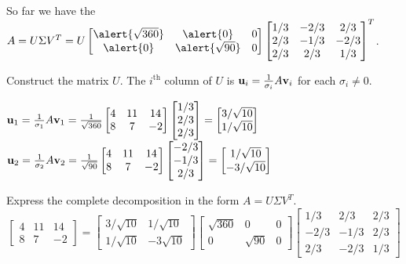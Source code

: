 \documentclass[xcolor=dvipsnames,aspectratio=169,t]{beamer}
\begin{document}
\begin{frame}

  So far we have the  $A = U \Sigma V^T= U  \begin{bmatrix} \alert{\sqrt{360}} & \alert{0} & 0 \\ \alert{0} & \alert{\sqrt{90}} & 0 \end{bmatrix}  \begin{bmatrix} 1/3 & -2/3 & 2/3 \\ 2/3 & -1/3 & -2/3 \\ 2/3 & 2/3 & 1/3 \end{bmatrix}^T$.
  \medskip

  \pause
  \bb
  \addtocounter{enumi}{2}
  \ii \alert{Construct the matrix $U$.}
  The $i^{\mbox{th}}$ column of $U$ is $\mathbf{u}_i = \frac{1}{\sigma_i}  A\mathbf{v}_i$ for each $\sigma_i \ne 0$.

  \bi
  \ii $\mathbf{u}_1 =  \frac{1}{\sigma_1} A\mathbf{v}_1 = \frac{1}{\sqrt{360} } \begin{bmatrix} 4 & 11 & 14 \\ 8 & 7 & -2 \end{bmatrix}  \begin{bmatrix} 1/3 \\ 2/3 \\ 2/3 \end{bmatrix} =  \begin{bmatrix}3/\sqrt{10} \\ 1/\sqrt{10} \end{bmatrix}$
  \ii $\mathbf{u}_2 =    \frac{1}{\sigma_2} A\mathbf{v}_2 = \frac{1}{\sqrt{90}} \begin{bmatrix} 4 & 11 & 14 \\ 8 & 7 & -2 \end{bmatrix} \begin{bmatrix} -2/3 \\ -1/3 \\ 2/3 \end{bmatrix} = \begin{bmatrix} 1/\sqrt{10} \\ -3/\sqrt{10} \end{bmatrix}$
  \ei
  \medskip

  \pause
  \ii \alert{Express the complete decomposition in the form $A = U \Sigma V^T$.}
  \[ \begin{bmatrix} 4 & 11 & 14 \\ 8 & 7 & -2 \end{bmatrix}  = \begin{bmatrix} 3/\sqrt{10} & 1/\sqrt{10} \\ 1/\sqrt{10} & -3\sqrt{10} \end{bmatrix}  \begin{bmatrix} \sqrt{360} & 0 & 0 \\ 0 & \sqrt{90} & 0 \end{bmatrix}  \begin{bmatrix} 1/3 & 2/3 & 2/3 \\ -2/3 & -1/3 & 2/3\\ 2/3 & -2/3 & 1/3 \end{bmatrix}\]
  \ee
  
\end{frame}
\end{document}
